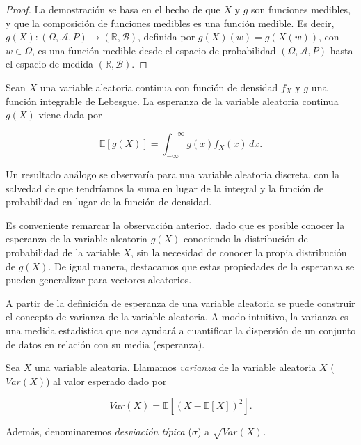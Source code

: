 \begin{proof}
    La demostración se basa en el hecho de que $X$ y $g$ son funciones medibles, y que la composición de funciones medibles es una función medible. Es decir, $ g(X):(\Omega, \mathcal{A}, P) \to (\mathbb{R}, \mathcal{B})$, definida por $g(X)(w) = g(X(w))$, con $w \in \Omega$, es una función medible desde el espacio de probabilidad $(\Omega, \mathcal{A}, P)$ hasta el espacio de medida $(\mathbb{R},\mathcal{B})$.
\end{proof}

\begin{observacion}
    Sean $X$ una variable aleatoria continua con función de densidad $f_X$ y $g$ una función integrable de Lebesgue. La esperanza de la variable aleatoria continua $g(X)$ viene dada por

    \[ \mathbb{E}[g(X)] =  \int_{-\infty}^{+\infty} g(x) f_{X}(x) \, dx. \]

    Un resultado análogo se observaría para una variable aleatoria discreta, con la salvedad de que tendríamos la suma en lugar de la integral y la función de probabilidad en lugar de la función de densidad.
\end{observacion}

Es conveniente remarcar la observación anterior, dado que es posible conocer la esperanza de la variable aleatoria $g(X)$ conociendo la distribución de probabilidad de la variable $X$, sin la necesidad de conocer la propia distribución de $g(X)$. De igual manera, destacamos que estas propiedades de la esperanza se pueden generalizar para vectores aleatorios.

A partir de la definición de esperanza de una variable aleatoria se puede construir el concepto de varianza de la variable aleatoria. A modo intuitivo, la varianza es una medida estadística que nos ayudará a cuantificar la dispersión de un conjunto de datos en relación con su media (esperanza).

\begin{definicion}\label{def:varianza-variable-aleatoria}
    Sea $X$ una variable aleatoria. Llamamos \emph{varianza} de la variable aleatoria $X$ ($Var(X)$) al valor esperado dado por

    \[ Var(X) = \mathbb{E}[{(X - \mathbb{E}[X])}^2]. \]

    Además, denominaremos \emph{desviación típica} ($\sigma$) a $\sqrt{Var(X)}$.
\end{definicion}

